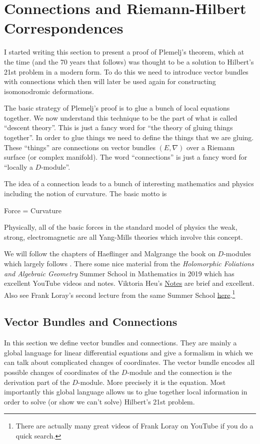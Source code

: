 \documentclass[12pt]{book}
\numberwithin{equation}{section}
\theoremstyle{definition}
\theoremstyle{remark}
\begin{document}
\chapter[Riemann-Hilbert]{Connections and Riemann-Hilbert Correspondences}
I started writing this section to present a proof of Plemelj's theorem, which at the time  (and the 70 years that follows) was thought to be a solution to Hilbert's 21st problem in a modern form. 
To do this we need to introduce vector bundles with connections which then will later be used again for constructing isomonodromic deformations. 

The basic strategy of Plemelj's proof is to glue a bunch of local equations together. 
We now understand this technique to be the part of what is called ``descent theory''. 
This is just a fancy word for ``the theory of gluing things together''.  
In order to glue things we need to define the things that we are gluing. 
These ``things'' are connections on vector bundles $(E,\nabla)$ over a Riemann surface (or complex manifold). 
The word ``connections'' is just a fancy word for ``locally a $D$-module''. 
 
The idea of a connection leads to a bunch of interesting mathematics and physics including the notion of curvature. 
The basic motto is 
\begin{center}
Force = Curvature
\end{center}
Physically, all of the basic forces in the standard model of physics the weak, strong, electromagnetic are all Yang-Mills theories which involve this concept.

We will follow the chapters of Haeflinger and Malgrange the book on $D$-modules  \cite[Chapters III, IV]{Borel1987} which largely follows \cite{Deligne1970}.
There some nice material from the \emph{Holomorphic Foliations and Algebraic Geometry} Summer School in Mathematics in 2019 which has excellent YouTube videos and notes. Viktoria Heu's \href{https://if-summer2019.sciencesconf.org/resource/page/id/1}{Notes} are brief and excellent. 
Also see Frank Loray's second lecture from the same Summer School \href{https://www.youtube.com/watch?v=qCujE4nU8bc}{here}.\footnote{There are actually many great videos of Frank Loray on YouTube if you do a quick search.}


\section{Vector Bundles and Connections}
In this section we define vector bundles and connections. 
They are mainly a global language for linear differential equations and give a formalism in which we can talk about complicated changes of coordinates.
The vector bundle encodes all possible changes of coordinates of the $D$-module and the connection is the derivation part of the $D$-module. 
More precisely it is the equation. 
Most importantly this global language allows us to glue together local information in order to solve (or show we can't solve) Hilbert's 21st problem.
\end{document}
